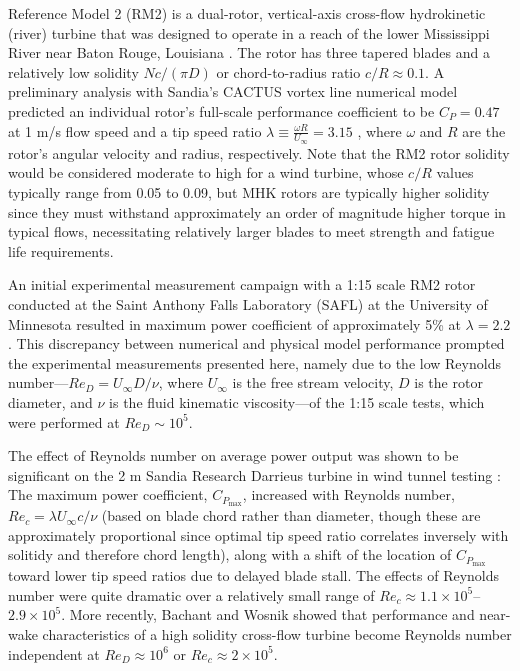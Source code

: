 \documentclass[10pt,letterpaper]{article}
\begin{document}
Reference Model 2 (RM2) is a dual-rotor, vertical-axis cross-flow hydrokinetic
(river) turbine that was designed to operate in a reach of the lower Mississippi
River near Baton Rouge, Louisiana \cite{Barone2011, Neary2011}. The rotor has
three tapered blades and a relatively low solidity $Nc/(\pi D)$ or
chord-to-radius ratio $c/R \approx 0.1$. A preliminary analysis with Sandia's
CACTUS vortex line numerical model \cite{Murray2011} predicted an individual
rotor's full-scale performance coefficient to be $C_P=0.47$ at 1 m/s flow speed
and a tip speed ratio $\lambda \equiv \frac{\omega R}{U_\infty} = 3.15$
\cite{Barone2011}, where $\omega$ and $R$ are the rotor's angular velocity and
radius, respectively. Note that the RM2 rotor solidity would be considered
moderate to high for a wind turbine, whose $c/R$ values typically range from
0.05 to 0.09, but MHK rotors are typically higher solidity since they must
withstand approximately an order of magnitude higher torque in typical flows,
necessitating relatively larger blades to meet strength and fatigue life
requirements.

An initial experimental measurement campaign with a 1:15 scale RM2 rotor
conducted at the Saint Anthony Falls Laboratory (SAFL) at the University of
Minnesota resulted in maximum power coefficient of approximately 5\% at $\lambda
= 2.2$ \cite{Hill2014}. This discrepancy between numerical and physical model
performance prompted the experimental measurements presented here, namely due to
the low Reynolds number---$Re_D = U_\infty D / \nu$, where $U_\infty$ is the
free stream velocity, $D$ is the rotor diameter, and $\nu$ is the fluid
kinematic viscosity---of the 1:15 scale tests, which were performed at $Re_D
\sim 10^5$.

The effect of Reynolds number on average power output was shown to be
significant on the 2 m Sandia Research Darrieus turbine in wind tunnel testing
\cite{Blackwell1976}: The maximum power coefficient, $C_{P_{\max}}$, increased
with Reynolds number, $Re_c=\lambda U_\infty c / \nu$ (based on blade chord
rather than diameter, though these are approximately proportional since optimal
tip speed ratio correlates inversely with solitidy and therefore chord length),
along with a shift of the location of $C_{P_{\max}}$ toward lower tip speed
ratios due to delayed blade stall. The effects of Reynolds number were quite
dramatic over a relatively small range of $Re_c \approx 1.1 \times 10^5$--$2.9
\times 10^5$. More recently, Bachant and Wosnik \cite{Bachant2014,
    Bachant2016-RVAT-Re-dep} showed that performance and near-wake characteristics
of a high solidity cross-flow turbine become Reynolds number independent at
$Re_D \approx 10^6$ or $Re_c \approx 2 \times 10^5$.
\end{document}
